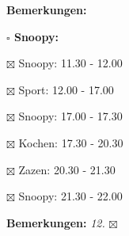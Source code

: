\documentclass[10pt,a4paper]{article}
\newcounter{notec}
\newcommand\prop[1] {{\color {alizarin} {\bf #1}}}             %
\newcommand\mand[1] {{\color {burntorange} {\bf #1}}}          %
\newcommand\bottomspace{\vskip 4pt}
\newcommand\n[1] { {\sl #1.} \hskip 5pt }
\begin{document}
\begin{mdframed}[style=daystyle]
\begin{labeling}{{\mand {Bemerkungen:}}}
\begin{minipage}{0.75\textwidth}
\begin{labeling}{\prop {$\square$ {Snoopy:}}}
      \item[$\boxtimes$ Snoopy:] 11.30 - 12.00
      \item[$\boxtimes$ Sport:]  12.00 - 17.00
        
      \item[$\boxtimes$ Snoopy:] 17.00 - 17.30
      \item[$\boxtimes$ Kochen:] 17.30 - 20.30
        
      \item[$\boxtimes$ Zazen:]  20.30 - 21.30
      \item[$\boxtimes$ Snoopy:] 21.30 - 22.00
      \end{labeling}
    \end{minipage}
    \bottomspace
  \item[{\mand {Bemerkungen:}}]    \n{12} $\boxtimes$
  \end{labeling}
    
  \setcounter{notec}{0}
  

\end{mdframed}
\end{document}
